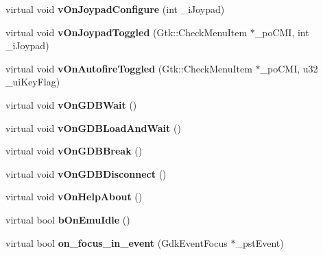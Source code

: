 \begin{DoxyCompactItemize}
\item 
\mbox{\label{class_v_b_a_1_1_window_a9a72206ce2e6c13d5bd66863292f9515}} 
virtual void {\bfseries v\+On\+Joypad\+Configure} (int \+\_\+i\+Joypad)
\item 
\mbox{\label{class_v_b_a_1_1_window_a38491fe3a0daf6be7ab610fd282d2e47}} 
virtual void {\bfseries v\+On\+Joypad\+Toggled} (Gtk\+::\+Check\+Menu\+Item $\ast$\+\_\+po\+C\+MI, int \+\_\+i\+Joypad)
\item 
\mbox{\label{class_v_b_a_1_1_window_a7267bdc270816ef841f3fe1bcfd03f27}} 
virtual void {\bfseries v\+On\+Autofire\+Toggled} (Gtk\+::\+Check\+Menu\+Item $\ast$\+\_\+po\+C\+MI, u32 \+\_\+ui\+Key\+Flag)
\item 
\mbox{\label{class_v_b_a_1_1_window_a35c038f07a5ea91103c5e05b82b8bd0b}} 
virtual void {\bfseries v\+On\+G\+D\+B\+Wait} ()
\item 
\mbox{\label{class_v_b_a_1_1_window_a266811d22fbeb400a01d1c2330fb9877}} 
virtual void {\bfseries v\+On\+G\+D\+B\+Load\+And\+Wait} ()
\item 
\mbox{\label{class_v_b_a_1_1_window_add1f8eb55cc9523cfdb6dbc3b9fbf4cf}} 
virtual void {\bfseries v\+On\+G\+D\+B\+Break} ()
\item 
\mbox{\label{class_v_b_a_1_1_window_ad6f454f394ed7265f374e78b2a255cbb}} 
virtual void {\bfseries v\+On\+G\+D\+B\+Disconnect} ()
\item 
\mbox{\label{class_v_b_a_1_1_window_a032219499a0266249033431bc86c559f}} 
virtual void {\bfseries v\+On\+Help\+About} ()
\item 
\mbox{\label{class_v_b_a_1_1_window_a2ac2bae273728c175c38770da8a9ad8a}} 
virtual bool {\bfseries b\+On\+Emu\+Idle} ()
\item 
\mbox{\label{class_v_b_a_1_1_window_a12b2428d319af7010bbc689193f1b801}} 
virtual bool {\bfseries on\+\_\+focus\+\_\+in\+\_\+event} (Gdk\+Event\+Focus $\ast$\+\_\+pst\+Event)

\end{DoxyCompactItemize}
